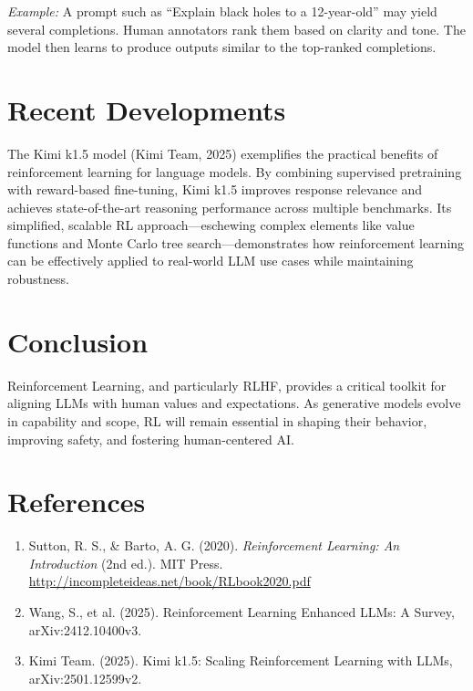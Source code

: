 \documentclass[11pt]{article}
\begin{document}
\textit{Example:} A prompt such as ``Explain black holes to a 12-year-old'' may yield several completions. Human annotators rank them based on clarity and tone. The model then learns to produce outputs similar to the top-ranked completions.

\section{Recent Developments}
The Kimi k1.5 model (Kimi Team, 2025) exemplifies the practical benefits of reinforcement learning for language models. By combining supervised pretraining with reward-based fine-tuning, Kimi k1.5 improves response relevance and achieves state-of-the-art reasoning performance across multiple benchmarks. Its simplified, scalable RL approach—eschewing complex elements like value functions and Monte Carlo tree search—demonstrates how reinforcement learning can be effectively applied to real-world LLM use cases while maintaining robustness.
\section{Conclusion}
Reinforcement Learning, and particularly RLHF, provides a critical toolkit for aligning LLMs with human values and expectations. As generative models evolve in capability and scope, RL will remain essential in shaping their behavior, improving safety, and fostering human-centered AI.

\section*{References}
\begin{enumerate}[leftmargin=1.5em,labelsep=0.5em]
    \item Sutton, R. S., \& Barto, A. G. (2020). \textit{Reinforcement Learning: An Introduction} (2nd ed.). MIT Press. \url{http://incompleteideas.net/book/RLbook2020.pdf}
    \item Wang, S., et al. (2025). Reinforcement Learning Enhanced LLMs: A Survey, arXiv:2412.10400v3.
    \item Kimi Team. (2025). Kimi k1.5: Scaling Reinforcement Learning with LLMs, arXiv:2501.12599v2.
\end{enumerate}
\end{document}
